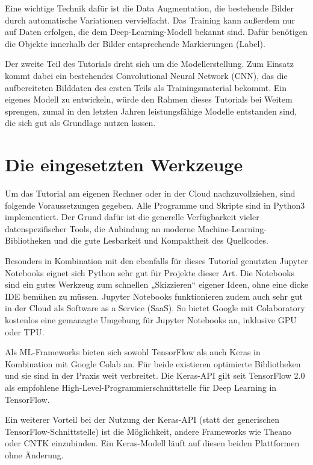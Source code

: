 Eine wichtige Technik dafür ist die Data Augmentation, die bestehende Bilder durch automatische Variationen vervielfacht. Das Training kann außerdem nur auf Daten erfolgen, die dem Deep-Learning-Modell bekannt sind. Dafür benötigen die Objekte innerhalb der Bilder entsprechende Markierungen (Label). 

Der zweite Teil des Tutorials dreht sich um die Modellerstellung. Zum Einsatz kommt dabei ein bestehendes Convolu­tional Neural Network (CNN), das die aufbereiteten Bilddaten des ersten Teils als Trainingsmaterial bekommt. Ein eigenes Modell zu entwickeln, würde den Rahmen dieses Tutorials bei Weitem sprengen, zumal in den letzten Jahren leistungsfähige Modelle entstanden sind, die sich gut als Grundlage nutzen lassen. 


\section{Die eingesetzten Werkzeuge}

Um das Tutorial am eigenen Rechner oder in der Cloud nachzuvollziehen, sind folgende Voraussetzungen gegeben. Alle Programme und Skripte sind in Python3 implementiert. Der Grund dafür ist die generelle Verfügbarkeit vieler datenspezifischer Tools, die Anbindung an moderne Machine-Learning-Bibliotheken und die gute Lesbarkeit und Kompaktheit des Quellcodes. 

Besonders in Kombination mit den ebenfalls für dieses Tutorial genutzten Jupyter Notebooks eignet sich Python sehr gut für Projekte dieser Art. Die Notebooks sind ein gutes Werkzeug zum schnellen „Skizzieren“ eigener Ideen, ohne eine dicke IDE bemühen zu müssen. Jupyter Notebooks funktionieren zudem auch sehr gut in der Cloud als Software as a Service (SaaS). So bietet Google mit Colaboratory kostenlos eine gemanagte Umgebung für Jupyter Notebooks an, inklusive GPU oder TPU. 

Als ML-Frameworks bieten sich sowohl TensorFlow als auch Keras in Kombination mit Google Colab an. Für beide existieren optimierte Bibliotheken und sie sind in der Praxis weit verbreitet. Die Keras-API gilt seit TensorFlow 2.0 als empfohlene High-Level-Programmierschnittstelle für Deep Learning in TensorFlow. 

Ein weiterer Vorteil bei der Nutzung der Keras-API (statt der generischen TensorFlow-Schnittstelle) ist die Möglichkeit, andere Frameworks wie Theano oder CNTK einzubinden. Ein Keras-Modell läuft auf diesen beiden Plattformen ohne Änderung. 

